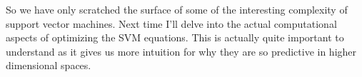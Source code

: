 \documentclass[xetex,mathserif,serif,aspectratio=169]{beamer}
\begin{document}
{
\begin{frame}[plain]
\end{frame}
}

\begin{frame}[fragile] \frametitle{} \oldB \small

\textbf{}

So we have only scratched the surface of some of the interesting complexity of
support vector machines. Next time I'll delve into the actual computational
aspects of optimizing the SVM equations. This is actually quite important to
understand as it gives us more intuition for why they are so predictive in
higher dimensional spaces.

\end{frame}
\end{document}
